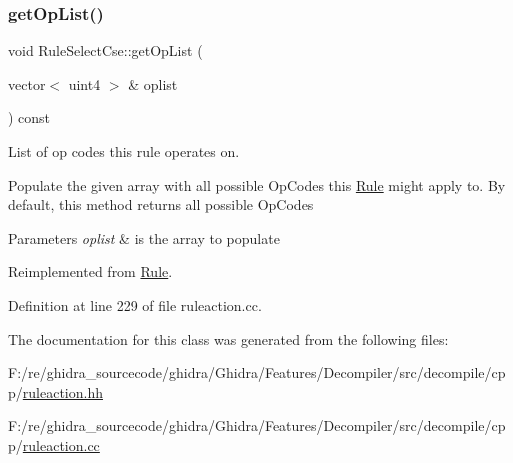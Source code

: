 \subsubsection{\texorpdfstring{getOpList()}{getOpList()}}
{\footnotesize\ttfamily void Rule\+Select\+Cse\+::get\+Op\+List (\begin{DoxyParamCaption}\item[{vector$<$ uint4 $>$ \&}]{oplist }\end{DoxyParamCaption}) const\hspace{0.3cm}{\ttfamily [virtual]}}



List of op codes this rule operates on. 

Populate the given array with all possible Op\+Codes this \mbox{\hyperlink{class_rule}{Rule}} might apply to. By default, this method returns all possible Op\+Codes 
\begin{DoxyParams}{Parameters}
{\em oplist} & is the array to populate \\
\hline
\end{DoxyParams}


Reimplemented from \mbox{\hyperlink{class_rule_a4023bfc7825de0ab866790551856d10e}{Rule}}.



Definition at line 229 of file ruleaction.\+cc.



The documentation for this class was generated from the following files\+:\begin{DoxyCompactItemize}
\item 
F\+:/re/ghidra\+\_\+sourcecode/ghidra/\+Ghidra/\+Features/\+Decompiler/src/decompile/cpp/\mbox{\hyperlink{ruleaction_8hh}{ruleaction.\+hh}}\item 
F\+:/re/ghidra\+\_\+sourcecode/ghidra/\+Ghidra/\+Features/\+Decompiler/src/decompile/cpp/\mbox{\hyperlink{ruleaction_8cc}{ruleaction.\+cc}}\end{DoxyCompactItemize}
